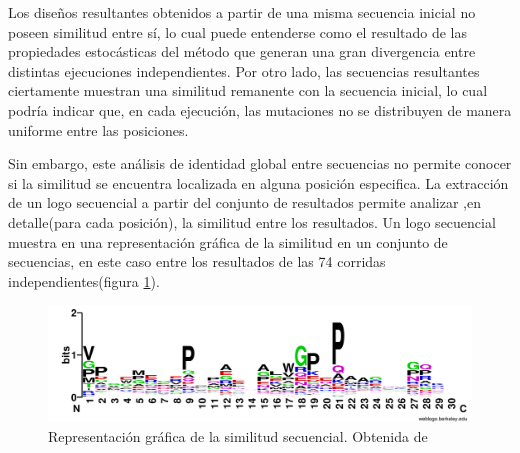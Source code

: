 Los diseños resultantes obtenidos a partir de una misma secuencia inicial no poseen similitud entre sí, lo cual puede entenderse como el resultado de las propiedades estocásticas del método que generan 
una gran divergencia entre distintas ejecuciones independientes.
Por otro lado, las secuencias resultantes ciertamente muestran una similitud remanente con la secuencia inicial, lo cual podría indicar que, en cada ejecución, las mutaciones no se distribuyen de manera uniforme entre las posiciones.

Sin embargo, este análisis de identidad global entre secuencias no permite conocer si la similitud se encuentra localizada en alguna posición especifica.
La extracción de un logo secuencial a partir del conjunto de resultados permite analizar ,en detalle(para cada posición), la similitud entre los resultados. 
Un logo secuencial muestra en una representación gráfica de la similitud en un conjunto de secuencias\cite{schneider1990sequence}, 
en este caso entre los resultados de las 74 corridas independientes(figura \ref{fig:logo}).

\begin{figure}[h]
\includegraphics[width=\textwidth]{img/resultados/logo.png}
\caption{Representación gráfica de la similitud secuencial. Obtenida de \cite{crooks2004weblogo}}
\label{fig:logo}
\end{figure}

